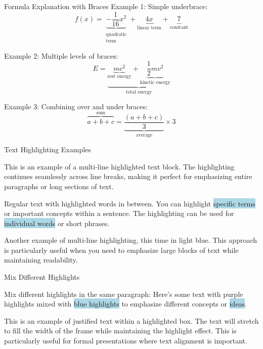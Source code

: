 \documentclass[handout,t,aspectratio=1610]{beamer}
\newcommand{\hlp}[1]{\colorbox{lightpurple}{#1}}
\newcommand{\hlb}[1]{\colorbox{lightblue}{#1}}
\begin{document}
\begin{frame}{Formula Explanation with Braces}
    Example 1: Simple underbrace:
    \[
        f(x) = \underbrace{-\frac{1}{16}x^2}_{
            \substack{\text{quadratic} \\ \text{term}}
        } + \underbrace{4x}_{
            \text{linear term}
        } + \underbrace{7}_{\text{constant}}
    \]

    Example 2: Multiple levels of braces:
    \[
        E = \underbrace{
            \underbrace{mc^2}_{\text{rest energy}} +
            \underbrace{\frac{1}{2}mv^2}_{\text{kinetic energy}}
        }_{\text{total energy}}
    \]

    Example 3: Combining over and under braces:
    \[
        \overbrace{
            a + b + c
        }^{\text{sum}} =
        \underbrace{
            \frac{(a+b+c)}{3}
        }_{\text{average}} \times 3
    \]

\end{frame}


\begin{frame}{Text Highlighting Examples}
    \begin{pbox}
    This is an example of a multi-line highlighted text block.
    The highlighting continues seamlessly across line breaks,
    making it perfect for emphasizing entire paragraphs or
    long sections of text.
    \end{pbox}

    \vspace{1em}

    Regular text with \hlp{highlighted words} in between. You can
    highlight \hlb{specific terms} or \hlp{important concepts}
    within a sentence. The highlighting can be used for
    \hlb{individual words} or \hlp{short phrases}.

    \vspace{1em}

    \begin{bluebox}
    Another example of multi-line highlighting, this time in
    light blue. This approach is particularly useful when you
    need to emphasize large blocks of text while maintaining
    readability.
    \end{bluebox}
\end{frame}


\begin{frame}{Mix Different Highlights}

    Mix different highlights in the same paragraph: Here's some
    text with \hlp{purple highlights} mixed with \hlb{blue highlights}
    to emphasize different \hlp{concepts} or \hlb{ideas}.

    \begin{bluebox}
    \justifying
    This is an example of justified text within a highlighted box.
    The text will stretch to fill the width of the frame while
    maintaining the highlight effect. This is particularly useful
    for formal presentations where text alignment is important.
    \end{bluebox}

\end{frame}
\end{document}
